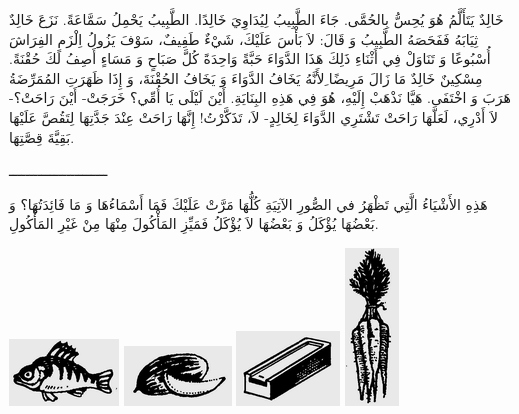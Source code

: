 \documentclass[a5paper]{article}
\begin{document}
خَالِدٌ يَتَأَلَّمُ هُوَ يُحِسُّ بِالحُمَّى. جَاءَ الطَّبِيبُ لِيُدَاوِيَ خَالِدًا. الطَّبِيبُ يَحْمِلُ سَمَّاعَةً. نَزَعَ خَالِدٌ ثِيَابَهُ فَفَحَصَهُ الطَّبِيبُ وَ قَالَ: لاَ بَأْسَ عَلَيْكَ، شَيْءٌ طَفِيفٌ، سَوْفَ يَزُولُ اِلْزَمِ الفِرَاشَ أُسْبُوعًا وَ تَنَاوَلْ فِي أَثْنَاءِ ذَلِكَ هَذَا الدَّوَاءَ حَبَّةً وَاحِدَةً كُلَّ صَبَاحٍ وَ مَسَاءٍ أَصِفُ لَكَ حُقْنَةً. مِسْكِينٌ خَالِدٌ مَا زَالَ مَرِيضًا ِلأَنَّهُ يَخَافُ الدَّوَاءَ وَ يَخَافُ الحُقْنَةَ، وَ إِذَا ظَهَرَتِ المُمَرِّضَةُ هَرَبَ وَ اخْتَفَى. هَيَّا نَذْهَبْ إِلَيْهِ، هُوَ فِي هَذِهِ البِنَايَةِ. أَيْنَ لَيْلَى يَا أُمِّي؟ خَرَجَتْ- أَيْنَ رَاحَتْ؟- لاَ أَدْرِي، لَعَلَّهَا رَاحَتْ تَشْتَرِي الدَّوَاءَ لِخَالِدٍ- لاَ، تَذَكَّرْتُ! إِنَّهَا رَاحَتْ عِنْدَ جَدَّتِهَا لِتَقُصَّ عَلَيْهَا بَقِيَّةَ قِصَّتِهَا.

ــــــــــــــــــــــــ

هَذِهِ الأَشْيَاءُ الَّتِي تَظْهَرُ في الصُّورِ الآتِيَةِ كُلُّهَا مَرَّتْ عَلَيْكَ فَمَا أَسْمَاءُهَا وَ مَا فَائِدَتُهَا؟ وَ بَعْضُهَا يُؤْكَلُ وَ بَعْضُهَا لاَ يُؤْكَلُ فَمَيِّزِ المَأْكُولَ مِنْهَا مِنْ غَيْرِ المَأْكُولِ.

 \includegraphics[width=1.1457in,height=0.698in]{MuhammadBagauddinlatinized-img323.png}   \includegraphics[width=1.1252in,height=0.6252in]{MuhammadBagauddinlatinized-img324.png}   \includegraphics[width=1.0835in,height=0.7811in]{MuhammadBagauddinlatinized-img325.png}   \includegraphics[width=0.5626in,height=1.6457in]{MuhammadBagauddinlatinized-img326.png} 
\end{document}
